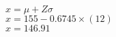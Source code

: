 \documentclass[11pt]{book}\usepackage[]{graphicx}\usepackage[]{color}
\begin{document}
\begin{exercises}
\begin{exercise}
	\end{exercise}
	\begin{solution}  %

	    $x = \mu + Z \sigma$ \\
	    $x = 155 - 0.6745 \times (12) $ \\
	    $x = 146.91$

  \end{solution}
  

%
%
%
%

\end{exercises}
\end{document}
